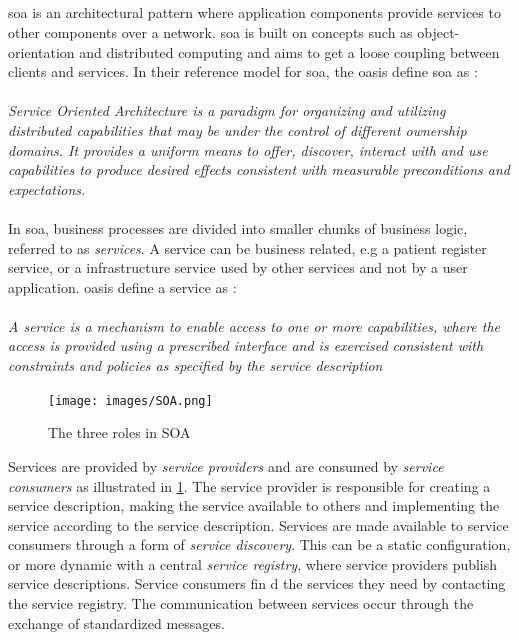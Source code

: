 \subsection{}
\gls{soa} is an architectural pattern where application components
provide services to other components over a network. \gls{soa} is built on
concepts such as object-orientation and distributed computing and aims to get
a loose coupling between clients and services. In their reference model for
\gls{soa}, the \gls{oasis} define \gls{soa} as \cite{oasis-soa-reference-model}:

\paragraph{}

\textit{Service Oriented Architecture is a paradigm for organizing and utilizing
distributed capabilities that may be under the control of different ownership
domains. It provides a uniform means to offer, discover, interact with and use
capabilities to produce desired effects consistent with measurable preconditions
and expectations.}

\paragraph{}

In \gls{soa}, business processes are divided into smaller chunks of business
logic, referred to as \textit{services}. A service can be business related, e.g
a patient register service, or a infrastructure service used by other services
and not by a user application. \gls{oasis} define a service as
\cite{oasis-soa-reference-model}:

\paragraph{}
\textit{
A service is a mechanism to enable access to one or more capabilities, where the
access is  provided using a prescribed interface and is exercised consistent
with constraints and policies as  specified by the service description
}

\begin{figure}[h]
\texttt{[image: images/SOA.png]}
\caption{The three roles in SOA}
\label{figure-soa-roles}
\end{figure}

Services are provided by \textit{service providers} and are consumed by
\textit{service consumers} as illustrated in \cref{figure-soa-roles}. The
service provider is responsible for creating a service description, making the
service available to others and implementing the service according to the
service description. Services are made available to service consumers through a
form of \textit{service discovery}. This can be a static configuration, or more
dynamic with a central \textit{service registry}, where service providers
publish service descriptions. Service consumers fin
d the services they need by
contacting the service registry. The communication between services occur
through the exchange of standardized messages.

